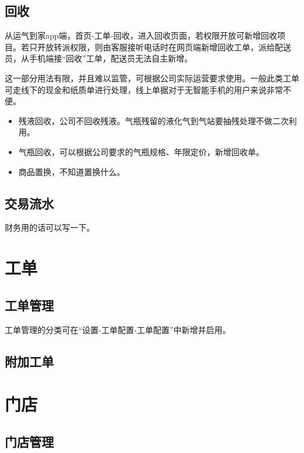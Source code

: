 \documentclass[UTF8]{ctexart}
\begin{document}
\subsection{回收}

从运气到家app端，首页-工单-回收，进入回收页面，若权限开放可新增回收项目。若只开放转派权限，则由客服接听电话时在网页端新增回收工单，派给配送员，从手机端接“回收”工单，配送员无法自主新增。

这一部分用法有限，并且难以监管，可根据公司实际运营要求使用。一般此类工单可走线下的现金和纸质单进行处理，线上单据对于无智能手机的用户来说非常不便。

\begin{itemize}
	
	\item 残液回收，公司不回收残液。气瓶残留的液化气到气站要抽残处理不做二次利用。
	
	\item 气瓶回收，可以根据公司要求的气瓶规格、年限定价，新增回收单。
	
	\item 商品置换，不知道置换什么。
	
\end{itemize}


\subsection{交易流水}

财务用的话可以写一下。


\section{工单}

\subsection{工单管理}

工单管理的分类可在“设置-工单配置-工单配置”中新增并启用。

\subsection{附加工单}




\section{门店}

\subsection{门店管理}
\end{document}
